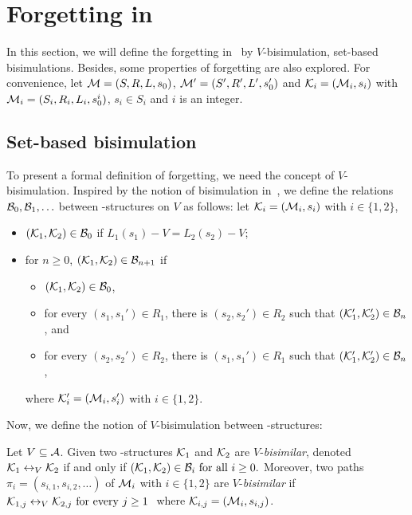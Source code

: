 \documentclass{article}
\begin{document}
\section{Forgetting in \CTL}
In this section, we will define the forgetting in \CTL\ by $V$-bisimulation, set-based bisimulations.
Besides, some properties of forgetting are also explored.
For convenience, let ${\cal M}=(S, R, L, s_0)$, ${\cal M}'=(S',R',L',s_0')$ and ${\cal K}_i=({\cal M}_i, s_i)$ with ${\cal M}_i=(S_i, R_i,L_i, s_0^i)$, $s_i \in S_i$ and $i$ is an integer.
\subsection{Set-based bisimulation}
To present a formal definition of forgetting, we need the concept of $V$-bisimulation.
Inspired by the notion of bisimulation in~\cite{DBLP:journals/tcs/BrowneCG88}, we define the relations ${\cal B}_0,{\cal B}_1,\ldots$
between \MPK-structures on $V$ as follows: let
${\cal K}_i=({\cal M}_i,s_i)$ with $i\in\{1,2\}$,
\begin{itemize}
  \item $({\cal K}_1,{\cal K}_2)\in{\cal B}_0$ if $L_1(s_1)- V=L_2(s_2)- V$;  %
  \item for $n\ge 0$, $({\cal K}_1,{\cal K}_2)\in{\cal B}_{n+1}$ if
  \begin{itemize}
    \item $({\cal K}_1,{\cal K}_2)\in{\cal B}_0$,
    \item for every $(s_1,s_1')\in R_1$, there is $(s_2,s_2')\in R_2$
    such that $({\cal K}_1',{\cal K}_2')\in {\cal B}_n$, and
    \item for every $(s_2,s_2')\in R_2$, there is $(s_1,s_1')\in R_1$
    such that $({\cal K}_1',{\cal K}_2')\in {\cal B}_n$,
  \end{itemize}
  where ${\cal K}_i'=({\cal M}_i,s_i')$ with $i\in\{1,2\}$.
\end{itemize}

Now, we define the notion of $V$-bisimulation between \MPK-structures:
\begin{definition}[$V$-bisimulation]
  \label{def:V-bisimulation}
   Let $V\subseteq\cal A$. Given   two \MPK-structures ${\cal K}_1$ and ${\cal K}_2$ are $V$-{\em bisimilar},  denoted ${\cal K}_1 \leftrightarrow_V {\cal K}_2$
 if and only if $ ({\cal K}_1,{\cal K}_2)\in {{\cal B}_i}\mbox{ for all }i\ge 0.$ Moreover, two paths $\pi_i=(s_{i,1},s_{i,2},\ldots)$ of ${\cal M}_i$ with $i\in \{1,2\}$
 are $V$-{\em bisimilar} if
$ {\cal K}_{1,j} \leftrightarrow_V {\cal K}_{2,j}\mbox { for every $j\ge 1$ }$
 where ${\cal K}_{i,j}=({\cal M}_i,s_{i,j})$.

\end{definition}
\end{document}
